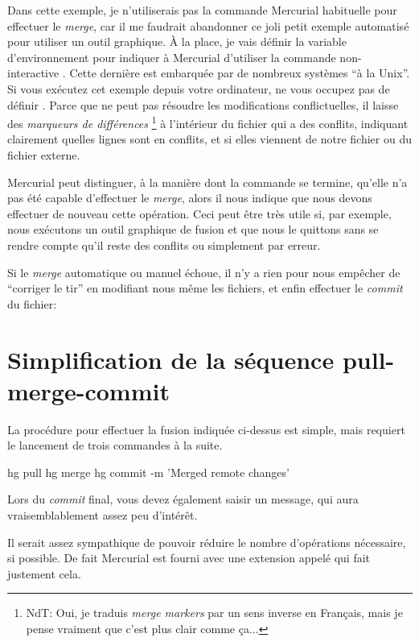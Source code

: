 Dans cette exemple, je n'utiliserais pas la commande Mercurial
habituelle  pour effectuer le \textit{merge},
car il me faudrait abandonner ce joli petit exemple automatisé
pour utiliser un outil graphique. À la place, je vais définir
la variable d'environnement  pour indiquer à 
Mercurial d'utiliser la commande non-interactive .
Cette dernière est embarquée par de nombreux systèmes ``à la Unix''.
Si vous exécutez cet exemple depuis votre ordinateur, ne vous
occupez pas de définir .
Parce que  ne peut pas résoudre les modifications
conflictuelles, il laisse des \emph{marqueurs de différences}
\footnote{NdT: Oui, je traduis \textit{merge markers} par un sens
inverse en Français, mais je pense vraiment que c'est plus clair 
comme ça...} à l'intérieur du fichier qui a des conflits, indiquant
clairement quelles lignes sont en conflits, et si elles viennent de
notre fichier ou du fichier externe.

Mercurial peut distinguer, à la manière dont la commande 
se termine, qu'elle n'a pas été capable d'effectuer le \textit{merge},
alors il nous indique que nous devons effectuer de nouveau cette
opération. Ceci peut être très utile si, par exemple, nous exécutons un
outil graphique de fusion et que nous le quittons sans se rendre compte
qu'il reste des conflits ou simplement par erreur.

Si le \textit{merge} automatique ou manuel échoue, il n'y a rien pour
nous empêcher de ``corriger le tir'' en modifiant nous même les fichiers,
et enfin effectuer le \textit{commit} du fichier:

\section{Simplification de la séquence pull-merge-commit}
\label{sec:tour-merge:fetch}

La procédure pour effectuer la fusion indiquée ci-dessus est simple,
mais requiert le lancement de trois commandes à la suite.
\begin{codesample2}
  hg pull
  hg merge
  hg commit -m 'Merged remote changes'
\end{codesample2}

Lors du \textit{commit} final, vous devez également saisir un message,
qui aura vraisemblablement assez peu d'intérêt.

Il serait assez sympathique de pouvoir réduire le nombre d'opérations
nécessaire, si possible. De fait Mercurial est fourni avec une
extension appelé  qui fait justement cela.

